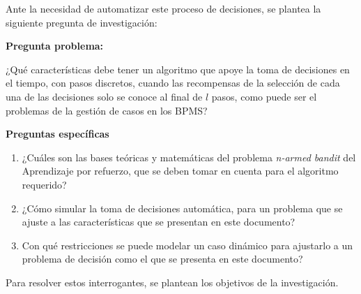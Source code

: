 Ante la necesidad de automatizar este proceso de decisiones, se plantea la siguiente pregunta de investigación:

\textbf{Pregunta problema:}

¿Qué características debe tener un algoritmo que apoye la toma de decisiones en el tiempo, con pasos discretos, cuando las recompensas de la selección de cada una de las decisiones solo se conoce al final de $l$ pasos, como puede ser el problemas de la gestión de casos en los BPMS?

\textbf{Preguntas específicas}

\begin{enumerate}

\item ¿Cuáles son las bases teóricas y matemáticas del problema \textit{n-armed bandit} del Aprendizaje por refuerzo, que se deben tomar en cuenta para el algoritmo requerido?
\item ¿Cómo simular la toma de decisiones automática, para un problema que se ajuste a las características que se presentan en este documento?
\item Con qué restricciones se puede modelar un caso dinámico para ajustarlo a un problema de decisión como el que se presenta en este documento?
\end{enumerate}

Para resolver estos interrogantes, se plantean los objetivos de la investigación.





